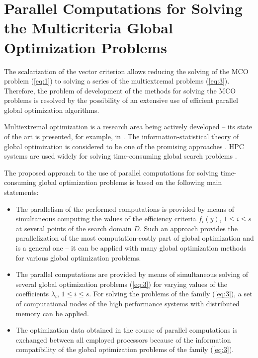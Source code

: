 \section{Parallel Computations for Solving the Multicriteria Global Optimization Problems}
\label{sec:3}
The scalarization of the vector criterion allows reducing the solving of the MCO problem (\ref{eq:1}) to solving a series of the multiextremal problems (\ref{eq:3}). Therefore, the problem of development of the methods for solving the MCO problems is resolved by the possibility of an extensive use of efficient parallel global optimization algorithms.

Multiextremal optimization is a research area being actively developed -- its state of the art is presented, for example, in \cite{c7,c9,c10}. The information-statistical theory of global optimization is considered to be one of the promising approaches \cite{c7}. HPC systems are used widely for solving time-consuming global search problems \cite{c7,c11,c14,c15}.

The proposed approach to the use of parallel computations for solving time-consuming global optimization problems is based on the following main statements:
\begin{itemize}

\item The parallelism of the performed computations is provided by means of simultaneous computing the values of the efficiency criteria $f_i (y)$, $1 \leq i \leq s$ at several points of the search domain $D$. Such an approach provides the parallelization of the most computation-costly part of global optimization and is a general one -- it can be applied with many global optimization methods for various global optimization problems.

\item The parallel computations are provided by means of simultaneous solving of several global optimization problems (\ref{eq:3}) for varying values of the coefficients $\lambda_i$, $1 \leq i \leq s$. For solving the problems of the family (\ref{eq:3}), a set of computational nodes of the high performance systems with distributed memory can be applied.

\item The optimization data obtained in the course of parallel computations is exchanged between all employed processors because of the information compatibility of the global optimization problems of the family (\ref{eq:3}).
\end{itemize}

